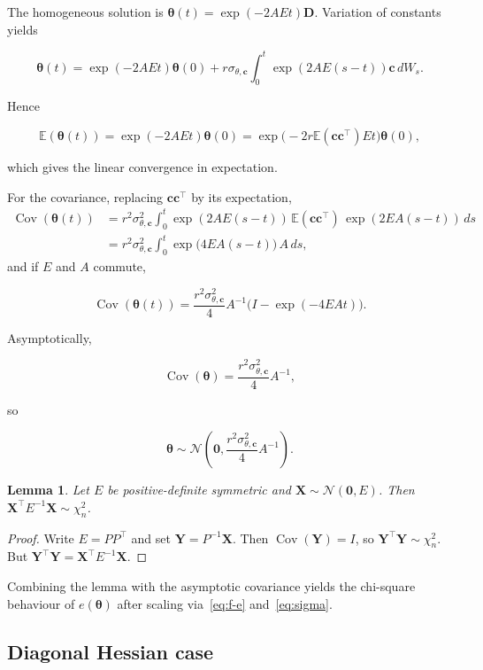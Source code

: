 \documentclass[11pt]{article}
\theoremstyle{plain}
\newtheorem{lemma}{Lemma}
\theoremstyle{definition}
\theoremstyle{remark}
\newcommand{\E}{\mathbb{E}}
\DeclareMathOperator{\Cov}{Cov}
\begin{document}
The homogeneous solution is $\bm{\theta}(t)=\exp(-2AE t)\bm{D}$. Variation of constants yields


\[
  \bm{\theta}(t)=\exp(-2AE t)\bm{\theta}(0) + r\sigma_{\theta,\bm{c}}\int_0^t \exp(2AE(s-t))\bm{c}\,dW_s.
\]


Hence

\[
  \E(\bm{\theta}(t))=\exp(-2AE t)\bm{\theta}(0)=\exp\bigl(-2r\E(\bm{c}\bm{c}^\top)E t\bigr)\bm{\theta}(0),
\]


which gives the linear convergence in expectation.

For the covariance, replacing $\bm{c}\bm{c}^\top$ by its expectation,
\begin{align*}
  \Cov(\bm{\theta}(t))
  &= r^2\sigma_{\theta,\bm{c}}^2\int_0^t \exp(2AE(s-t))\,\E(\bm{c}\bm{c}^\top)\,\exp(2EA(s-t))\,ds \\
  &= r^2\sigma_{\theta,\bm{c}}^2\int_0^t \exp\bigl(4EA(s-t)\bigr)\,A\,ds,
\end{align*}
and if $E$ and $A$ commute,


\[
  \Cov(\bm{\theta}(t))=\frac{r^2\sigma_{\theta,\bm{c}}^2}{4}A^{-1}\bigl(I-\exp(-4EA t)\bigr).
\]


Asymptotically,


\[
  \Cov(\bm{\theta})=\frac{r^2\sigma_{\theta,\bm{c}}^2}{4}A^{-1},
\]


so


\[
  \bm{\theta}\sim\mathcal{N}\!\left(\bm{0},\frac{r^2\sigma_{\theta,\bm{c}}^2}{4}A^{-1}\right).
\]



\begin{lemma}
Let $E$ be positive-definite symmetric and $\bm{X}\sim\mathcal{N}(\bm{0},E)$. Then $\bm{X}^\top E^{-1}\bm{X}\sim\chi^2_n$.
\end{lemma}

\begin{proof}
Write $E=PP^\top$ and set $\bm{Y}=P^{-1}\bm{X}$. Then $\Cov(\bm{Y})=I$, so $\bm{Y}^\top\bm{Y}\sim\chi^2_n$. But $\bm{Y}^\top\bm{Y}=\bm{X}^\top E^{-1}\bm{X}$.
\end{proof}

Combining the lemma with the asymptotic covariance yields the chi-square behaviour of $e(\bm{\theta})$ after scaling via~\eqref{eq:f-e} and~\eqref{eq:sigma}.

\subsection{Diagonal Hessian case}
\end{document}
